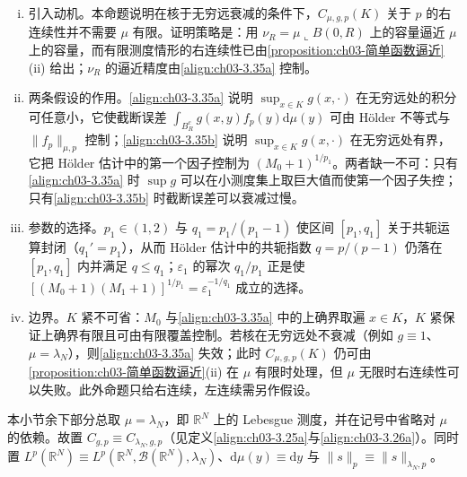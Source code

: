 \documentclass[../../main.tex]{subfiles}%
\begin{document}
\begin{remark}\label{remark:ch03-p右连续}
\begin{enumerate}[(i)]
\item 引入动机。本命题说明在核于无穷远衰减的条件下，$C_{\mu,g,p}(K)$ 关于 $p$ 的右连续性并不需要 $\mu$ 有限。证明策略是：用 $\nu_R=\mu\llcorner B(0,R)$ 上的容量逼近 $\mu$ 上的容量，而有限测度情形的右连续性已由\cref{proposition:ch03-简单函数逼近}(ii) 给出；$\nu_R$ 的逼近精度由\eqref{align:ch03-3.35a} 控制。

\item 两条假设的作用。\eqref{align:ch03-3.35a} 说明 $\sup_{x\in K}g(x,\cdot)$ 在无穷远处的积分可任意小，它使截断误差 $\int_{B_R^c}g(x,y)f_p(y)\mathrm{d}\mu(y)$ 可由 Hölder 不等式与 $\|f_p\|_{\mu,p}$ 控制；\eqref{align:ch03-3.35b} 说明 $\sup_{x\in K}g(x,\cdot)$ 在无穷远处有界，它把 Hölder 估计中的第一个因子控制为 $(M_0+1)^{1/p_1}$。两者缺一不可：只有\eqref{align:ch03-3.35a} 时 $\sup g$ 可以在小测度集上取巨大值而使第一个因子失控；只有\eqref{align:ch03-3.35b} 时截断误差可以衰减过慢。

\item 参数的选择。$p_1\in(1,2)$ 与 $q_1=p_1/(p_1-1)$ 使区间 $[p_1,q_1]$ 关于共轭运算封闭（$q_1'=p_1$），从而 Hölder 估计中的共轭指数 $q=p/(p-1)$ 仍落在 $[p_1,q_1]$ 内并满足 $q\leqslant q_1$；$\varepsilon_1$ 的幂次 $q_1/p_1$ 正是使 $\left[(M_0+1)(M_1+1)\right]^{1/p_1}=\varepsilon_1^{-1/q_1}$ 成立的选择。

\item 边界。$K$ 紧不可省：$M_0$ 与\eqref{align:ch03-3.35a} 中的上确界取遍 $x\in K$，$K$ 紧保证上确界有限且可由有限覆盖控制。若核在无穷远处不衰减（例如 $g\equiv1$、$\mu=\lambda_N$），则\eqref{align:ch03-3.35a} 失效；此时 $C_{\mu,g,p}(K)$ 仍可由\cref{proposition:ch03-简单函数逼近}(ii) 在 $\mu$ 有限时处理，但 $\mu$ 无限时右连续性可以失败。此外命题只给右连续，左连续需另作假设。
\end{enumerate}
\end{remark}

本小节余下部分总取 $\mu=\lambda_N$，即 $\mathbb{R}^N$ 上的 Lebesgue 测度，并在记号中省略对 $\mu$ 的依赖。故置 $C_{g,p}\equiv C_{\lambda_N,g,p}$（见定义\eqref{align:ch03-3.25a}与\eqref{align:ch03-3.26a}）。同时置 $L^p(\mathbb{R}^N)\equiv L^p(\mathbb{R}^N,\mathcal{B}(\mathbb{R}^N),\lambda_N)$、$\mathrm{d}\mu(y)\equiv\mathrm{d}y$ 与 $\|s\|_p\equiv\|s\|_{\lambda_N,p}$。
\end{document}
